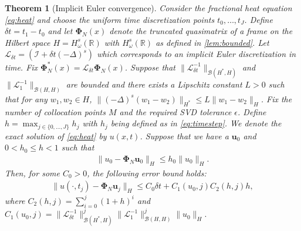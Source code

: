 \documentclass[10pt,a4paper]{article}
\newtheorem{theorem}{Theorem}[section]
\numberwithin{equation}{section}
\begin{document}
\begin{theorem}[Implicit Euler convergence]
\label{th:implicit-euler}
Consider the fractional heat equation \cref{eq:heat} and choose the uniform time discretization points $t_0, \dots, t_J$. Define $\delta t =t_1 - t_0$ and let ${\bm \Phi}_N(x)$ denote the truncated quasimatrix of a frame on the Hilbert space $H = H^s_\omega(\mathbb{R})$ with $H^s_\omega(\mathbb{R})$ as defined in \cref{lem:bounded}. Let $\mathcal{L}_{\delta t} = (\mathcal{I} + \delta t (-\Delta)^s)$ which corresponds to an implicit Euler discretization in time. Fix ${\bm \Phi}_N^*(x) = \mathcal{L}_{\delta t}{\bm \Phi}_N(x)$. Suppose that $\| \mathcal{L}^{-1}_{\delta t} \|_{{\mathcal{B}(H^*,H)}}$ and  $\| \mathcal{L}_1^{-1} \|_{{\mathcal{B}(H,H)}}$ are bounded and there exists a Lipschitz constant $L>0$ such that for any $w_1, w_2 \in H$, $\|(-\Delta)^s (w_1 - w_2) \|_{H^*} \leq L \| w_1 - w_2\|_H$. Fix the number of collocation points $M$ and the required SVD tolerance $\epsilon$. Define $h = \max_{j \in \{0,\dots,J\}} h_j$ with $h_j$ being defined as in \cref{eq:timestep}. We denote the exact solution of \cref{eq:heat} by $u(x,t)$. Suppose that we have a ${\mathbf u}_0$ and $0<h_0 \leq h <1$ such that 
\begin{align}
\| u_0 - {\bm \Phi}_N {\mathbf u}_{0}\|_{H} \leq h_0 \|  u_0\|_{H}.
\end{align}
Then, for some $C_0> 0$, the following error bound holds:
\begin{align}
\| u(\cdot, t_j) - {\bm \Phi}_N {\mathbf u}_j \|_{H} \leq   C_0 \delta t  +C_1(u_0,j) C_2(h,j) h,
\end{align}
where 
$
C_2(h,j)=   \sum_{i=0}^{j}  (1+h)^{i}$ and $
C_1(u_0,j) =  \| \mathcal{L}^{-1}_{\delta t}\|^{j}_{\mathcal{B}(H^*,H)}  \| \mathcal{L}^{-1}_1\|^{j}_{\mathcal{B}(H,H)} \| u_0\|_H.
$
\end{theorem}
\end{document}
